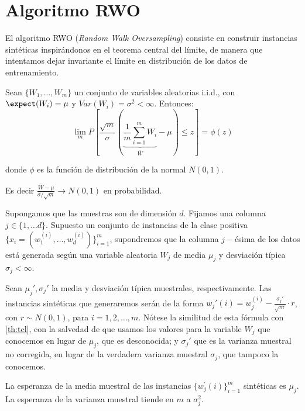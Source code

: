 \section{Algoritmo RWO}
El algoritmo RWO (\textit{Random Walk Oversampling}) consiste en construir instancias sintéticas inspirándonos
en el teorema central del límite, de manera que intentamos dejar invariante el límite en distribución de los
datos de entrenamiento.

\begin{theorem}
 Sean $\{W_1, \ldots, W_m\}$ un conjunto de variables aleatorias i.i.d., con $\expect(W_i) = \mu$ y 
 $Var(W_i) = \sigma^2 < \infty$. Entonces: 
 \[
   \lim_{m} P\left[\frac{\sqrt{m}}{\sigma} \left(\underbrace{\frac{1}{m}\sum_{i=1}^m W_i}_{\overline{W}} - 
   \mu \right) \le z \right] = \phi(z)
 \]
 
 donde $\phi$ es la función de distribución de la normal $N(0,1)$.
 
 Es decir $\frac{\overline{W} - \mu}{\sigma/\sqrt{m}} \rightarrow N(0,1)$ en probabilidad.
 
 \label{th:tcl}
\end{theorem}

Supongamos que las muestras son de dimensión $d$. Fijamos una columna $j\in \{1, \ldots d\}$. Supuesto un
conjunto de instancias de la clase positiva $\{x_i=(w_1^{(i)}, \ldots, w_d^{(i)})\}_{i=1}^m$, supondremos que la
columna $j-$ésima de los datos está generada según una variable aleatoria $W_j$ de media $\mu_j$ y desviación
típica $\sigma_j < \infty$.

Sean $\mu_j', \sigma_j'$ la media y desviación típica muestrales, respectivamente. Las instancias sintéticas 
que generaremos serán de la forma $w_j'(i) = w_j^{(i)} - \frac{\sigma_j'}{\sqrt{m}} \cdot r$, con 
$r\sim N(0,1)$, para $i=1, 2, \ldots, m$. Nótese la similitud de esta fórmula con \ref{th:tcl}, con la salvedad
de que usamos los valores para la variable $W_j$ que conocemos en lugar de $\mu_j$, que es desconocida; y 
$\sigma_j'$ que es la varianza muestral no corregida, en lugar de la verdadera varianza muestral $\sigma_j$, 
que tampoco la conocemos.

\begin{theorem}
 La esperanza de la media muestral de las instancias $\{w_j^{'}(i)\}_{i=1}^m$ sintéticas es $\mu_j$. 
 La esperanza de la varianza muestral tiende en $m$ a $\sigma_j^2$.
 \label{th:asyn-guarantee}
\end{theorem}


